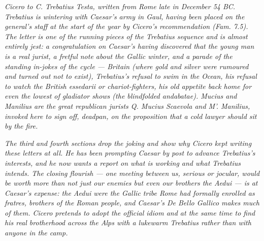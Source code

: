 
\textit{Cicero to C. Trebatius Testa, written from Rome late in
December 54 BC. Trebatius is wintering with Caesar's army in
Gaul, having been placed on the general's staff at the start of
the year by Cicero's recommendation (\textit{Fam.} 7.5). The
letter is one of the running pieces of the Trebatius sequence
and is almost entirely jest: a congratulation on Caesar's having
discovered that the young man is a real jurist, a fretful note
about the Gallic winter, and a parade of the standing in-jokes
of the cycle --- Britain (where gold and silver were rumoured and
turned out not to exist), Trebatius's refusal to swim in the
Ocean, his refusal to watch the British \textit{essedarii} or
chariot-fighters, his old appetite back home for even the
lowest of gladiator shows (the blindfolded \textit{andabatae}).
\textit{Mucius} and \textit{Manilius} are the great republican
jurists Q. Mucius Scaevola and M'. Manilius, invoked here to
sign off, deadpan, on the proposition that a cold lawyer should
sit by the fire.}

\textit{The third and fourth sections drop the joking and show
why Cicero kept writing these letters at all. He has been
prompting Caesar by post to advance Trebatius's interests, and
he now wants a report on what is working and what Trebatius
intends. The closing flourish --- one meeting between us, serious
or jocular, would be worth more than not just our enemies but
even our brothers the Aedui --- is at Caesar's expense: the Aedui
were the Gallic tribe Rome had formally enrolled as
\textit{fratres}, brothers of the Roman people, and Caesar's
\textit{De Bello Gallico} makes much of them. Cicero pretends to
adopt the official idiom and at the same time to find his real
brotherhood across the Alps with a lukewarm Trebatius rather
than with anyone in the camp.}
